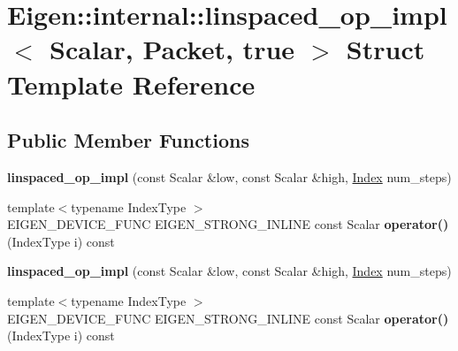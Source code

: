\hypertarget{struct_eigen_1_1internal_1_1linspaced__op__impl_3_01_scalar_00_01_packet_00_01true_01_4}{}\section{Eigen\+:\+:internal\+:\+:linspaced\+\_\+op\+\_\+impl$<$ Scalar, Packet, true $>$ Struct Template Reference}
\label{struct_eigen_1_1internal_1_1linspaced__op__impl_3_01_scalar_00_01_packet_00_01true_01_4}
\subsection*{Public Member Functions}
\begin{DoxyCompactItemize}
\item 
\mbox{\label{struct_eigen_1_1internal_1_1linspaced__op__impl_3_01_scalar_00_01_packet_00_01true_01_4_af106870466a5d172c2fc61eb93228e88}} 
{\bfseries linspaced\+\_\+op\+\_\+impl} (const Scalar \&low, const Scalar \&high, \hyperlink{namespace_eigen_a62e77e0933482dafde8fe197d9a2cfde}{Index} num\+\_\+steps)
\item 
\mbox{\label{struct_eigen_1_1internal_1_1linspaced__op__impl_3_01_scalar_00_01_packet_00_01true_01_4_a590af4b00bfd20454a29b7d276724329}} 
{\footnotesize template$<$typename Index\+Type $>$ }\\E\+I\+G\+E\+N\+\_\+\+D\+E\+V\+I\+C\+E\+\_\+\+F\+U\+NC E\+I\+G\+E\+N\+\_\+\+S\+T\+R\+O\+N\+G\+\_\+\+I\+N\+L\+I\+NE const Scalar {\bfseries operator()} (Index\+Type i) const
\item 
\mbox{\label{struct_eigen_1_1internal_1_1linspaced__op__impl_3_01_scalar_00_01_packet_00_01true_01_4_af106870466a5d172c2fc61eb93228e88}} 
{\bfseries linspaced\+\_\+op\+\_\+impl} (const Scalar \&low, const Scalar \&high, \hyperlink{namespace_eigen_a62e77e0933482dafde8fe197d9a2cfde}{Index} num\+\_\+steps)
\item 
\mbox{\label{struct_eigen_1_1internal_1_1linspaced__op__impl_3_01_scalar_00_01_packet_00_01true_01_4_a590af4b00bfd20454a29b7d276724329}} 
{\footnotesize template$<$typename Index\+Type $>$ }\\E\+I\+G\+E\+N\+\_\+\+D\+E\+V\+I\+C\+E\+\_\+\+F\+U\+NC E\+I\+G\+E\+N\+\_\+\+S\+T\+R\+O\+N\+G\+\_\+\+I\+N\+L\+I\+NE const Scalar {\bfseries operator()} (Index\+Type i) const
\end{DoxyCompactItemize}
